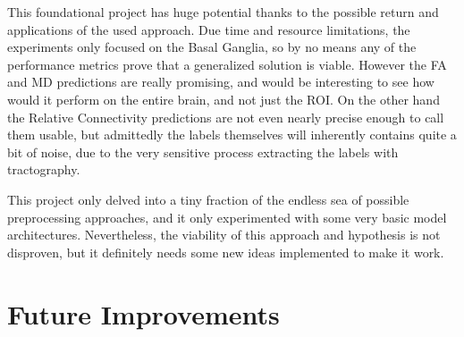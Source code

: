 \label{sec:conclusions}

This foundational project has huge potential thanks to the possible return and applications of the used approach. Due time and resource limitations, the experiments only focused on the Basal Ganglia, so by no means any of the performance metrics prove that a generalized solution is viable. However the \ac{FA} and \ac{MD} predictions are really promising, and would be interesting to see how would it perform on the entire brain, and not just the \ac{ROI}. On the other hand the Relative Connectivity predictions are not even nearly precise enough to call them usable, but admittedly the labels themselves will inherently contains quite a bit of noise, due to the very sensitive process extracting the labels with tractography.\par
This project only delved into a tiny fraction of the endless sea of possible preprocessing approaches, and it only experimented with some very basic model architectures. Nevertheless, the viability of this approach and hypothesis is not disproven, but it definitely needs some new ideas implemented to make it work.\par

\section{Future Improvements}
\label{sec:improve}

